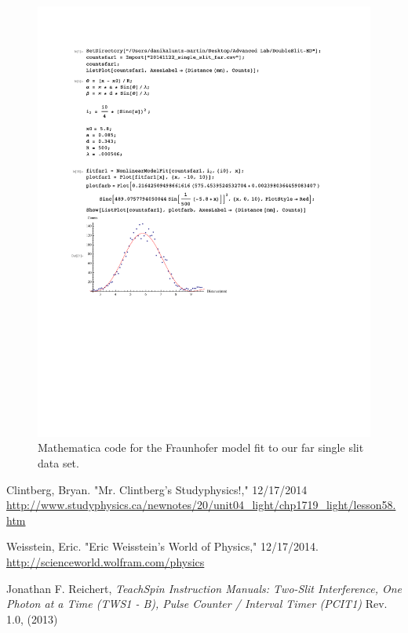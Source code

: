\documentclass[prb,preprint]{revtex4-1}
\begin{document}
\begin{figure}[h!]
\centering
\includegraphics[width=6in]{SingleFarFraun.pdf}
\caption{Mathematica code for the Fraunhofer model fit to our far single slit data set.}
\label{SingleFarFraun}
\end{figure}

\newpage
\begin{thebibliography}{3}

 Clintberg, Bryan. "Mr. Clintberg's Studyphysics!," 12/17/2014 \url{http://www.studyphysics.ca/newnotes/20/unit04_light/chp1719_light/lesson58.htm}

 Weisstein, Eric. "Eric Weisstein's World of Physics," 12/17/2014. \url{http://scienceworld.wolfram.com/physics}

 Jonathan F. Reichert, \textit{TeachSpin Instruction Manuals: Two-Slit Interference, One Photon at a Time (TWS1 - B), Pulse Counter / Interval Timer (PCIT1)} Rev. 1.0, (2013)

\end{thebibliography}
\end{document}
